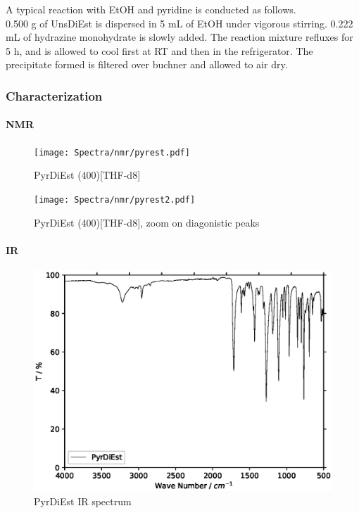 \documentclass[../Master.tex]{subfiles}
\begin{document}
A typical reaction with EtOH and pyridine is conducted as follows. \\
0.500 g of UnsDiEst is dispersed in 5 mL of EtOH under vigorous stirring. 0.222 mL of hydrazine monohydrate is slowly added. The reaction mixture refluxes for 5 h, and is allowed to cool first at RT and then in the refrigerator. The precipitate formed is filtered over buchner and allowed to air dry.

\newpage
\subsubsection{Characterization}
\newline
\paragraph{NMR}

\begin{figure}[h!]
	\centering
	\texttt{[image: Spectra/nmr/pyrest.pdf]}
	\caption{PyrDiEst (400)[THF-d8]}
\end{figure}

\begin{figure}[h!]
	\centering
	\texttt{[image: Spectra/nmr/pyrest2.pdf]}
	\caption{PyrDiEst (400)[THF-d8], zoom on diagonistic peaks}
\end{figure}
\newpage
\paragraph{IR}
\begin{figure}[h!]
	\centering
	\includegraphics[width=12cm,keepaspectratio]{Spectra/ir/PyrDiEst.eps}
	\caption{PyrDiEst IR spectrum}
\end{figure}
\end{document}
